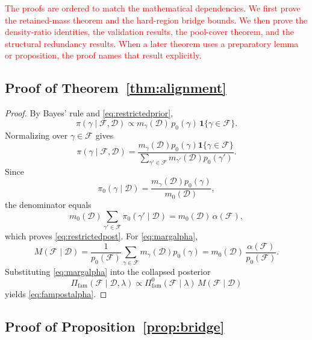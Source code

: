 \documentclass[twoside,11pt]{article}
\newcommand{\D}{\mathcal{D}}
\newcommand{\F}{\mathcal{F}}
\newcommand{\ind}{\mathbf{1}}
\newcommand{\rev}[1]{\textcolor{red}{#1}}
\begin{document}
\rev{The proofs are ordered to match the mathematical dependencies. We first prove the retained-mass theorem and the hard-region bridge bounds. We then prove the density-ratio identities, the validation results, the pool-cover theorem, and the structural redundancy results. When a later theorem uses a preparatory lemma or proposition, the proof names that result explicitly.}

\subsection{Proof of Theorem~\ref{thm:alignment}}

\begin{proof} By Bayes' rule and \eqref{eq:restrictedprior},
\[
\pi(\gamma \mid \F,\D) \propto m_\gamma(\D)\,p_0(\gamma)\,\ind\{\gamma \in \F\}.
\]
Normalizing over $\gamma \in \F$ gives
\[
\pi(\gamma \mid \F,\D) = \frac{m_\gamma(\D)p_0(\gamma)\ind\{\gamma \in \F\}} {\sum_{\gamma' \in \F} m_{\gamma'}(\D)p_0(\gamma')}.
\]
Since
\[
\pi_0(\gamma \mid \D)=\frac{m_\gamma(\D)p_0(\gamma)}{m_0(\D)},
\]
the denominator equals
\[
m_0(\D)\sum_{\gamma' \in \F}\pi_0(\gamma' \mid \D) = m_0(\D)\,\alpha(\F),
\]
which proves \eqref{eq:restrictedpost}. For \eqref{eq:margalpha},
\[
M(\F \mid \D) = \frac{1}{p_0(\F)} \sum_{\gamma \in \F} m_\gamma(\D)p_0(\gamma) = m_0(\D)\,\frac{\alpha(\F)}{p_0(\F)}.
\]
Substituting \eqref{eq:margalpha} into the collapsed posterior
\[
\Pi_{\mathrm{fam}}(\F \mid \D,\lambda) \propto \Pi_{\mathrm{fam}}^0(\F \mid \lambda)\,M(\F \mid \D)
\]
yields \eqref{eq:fampostalpha}.
\end{proof}

\subsection{Proof of Proposition~\ref{prop:bridge}}
\end{document}
